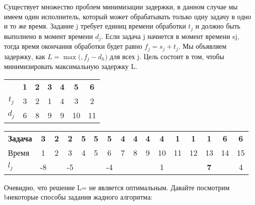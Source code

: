 \vspace{\baselineskip}
Существует множество проблем минимизации задержки, в данном случае мы имеем один исполнитель, который может обрабатывать только одну задачу в одно и то же время. Задание j требует единиц времени обработки $t_j$ и должно быть выполнено в момент времени $d_j$. Если задача j начнется в момент времени sj, тогда время окончания обработки будет равно $f_j = s_j+t_j$. Мы объявляем задержку, как $L = \max(${\color{Purple}{0}}$, f_j - d_h)$ для всех j. Цель состоит в том, чтобы минимизировать максимальную задержку L.

\vspace{\baselineskip}
\begin{tabular}{ccccccc}
\multicolumn{1}{c}{\textbf{}} &
\multicolumn{1}{c}{\textbf{1}} & \multicolumn{1}{c}{\textbf{2}} & \multicolumn{1}{c}{\textbf{3}} & \multicolumn{1}{c}{\textbf{4}} &
\multicolumn{1}{c}{\textbf{5}} &
\multicolumn{1}{c}{\textbf{6}} \\[5pt]
\ttfamily $t_j$ & 3 & 2 & 1 & 4 & 3 & 2\\[5pt]
\ttfamily $d_j$ & 6 & 8 & 9 & 9 & 10 & 11\\[5pt]
\end{tabular}

\vspace{\baselineskip}
\begin{tabular}{lccccccccccccccc}
\multicolumn{1}{l}{\textbf{Задача}} & \multicolumn{1}{c}{\textbf{3}} & \multicolumn{1}{c}{\textbf{2}} & \multicolumn{1}{c}{\textbf{2}} &
\multicolumn{1}{c}{\textbf{5}} &
\multicolumn{1}{c}{\textbf{5}} &
\multicolumn{1}{c}{\textbf{5}} &
\multicolumn{1}{c}{\textbf{4}} &
\multicolumn{1}{c}{\textbf{4}} &
\multicolumn{1}{c}{\textbf{4}} &
\multicolumn{1}{c}{\textbf{4}} &
\multicolumn{1}{c}{\textbf{1}} &
\multicolumn{1}{c}{\textbf{1}} &
\multicolumn{1}{c}{\textbf{1}} &
\multicolumn{1}{c}{\textbf{6}} &
\multicolumn{1}{c}{\textbf{6}}\\[5pt]
\ttfamily Время & 1 & 2 & 3 & 4 & 5 & 6 & 7 & 8 & 9 & 10 & 11 & 12 & 13 & 14 & 15\\[5pt]
\ttfamily $l_j$ & -8 & \ & -5 & \ & \ & -4 & \ & \ & \ & 1 & \ & \ & \textbf{7} & \ & 4\\[5pt]
\end{tabular}

\vspace{\baselineskip}
Очевидно, что решение L={\color{Purple}{7}} не является оптимальным. Давайте посмотрим bнекоторые способы задания жадного алгоритма:

